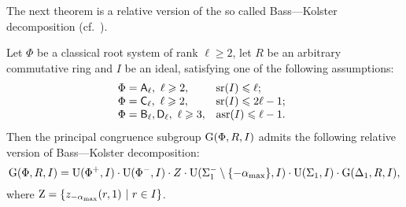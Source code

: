 The next theorem is a relative version of the so called Bass---Kolster decomposition (cf.~\cite[Theorem~2.1]{St78}).
\begin{thm}\label{thm:BassKolster}
Let $\Phi$ be a classical root system of rank $\ell\geqslant2$, let $R$ be an arbitrary commutative ring and $I$ be an ideal, satisfying one of the following assumptions:
\[\begin{array}{l@{\quad}l@{\quad}l@{\quad}c}
\Phi = \rA_\ell,\ \ell\geqslant 2, & \sr(I) \leqslant \ell; \\
\Phi = \rC_\ell,\ \ell\geqslant 2, & \sr(I) \leqslant 2\ell-1; \\
\Phi = \rB_\ell, \rD_\ell,\ \ell\geqslant 3, & \asr(I) \leqslant \ell-1.
\end{array}\]
Then the principal congruence subgroup $\operatorname{G}(\Phi,R,I)$ admits the following relative version of Bass---Kolster decomposition:
\[ \operatorname{G}(\Phi,R,I)=  \operatorname{U}(\Phi^+,I) \cdot \operatorname{U}(\Phi^-,I) \cdot Z \cdot \operatorname{U}(\Sigma_1^-\setminus\{-\alpha_\mathrm{max}\},I) \cdot \operatorname{U}(\Sigma_1,I) \cdot \operatorname{G}(\Delta_1,R,I), \]
where $\Z=\left\{ z_{-\alpha_\mathrm{max}}(r,1)\ \middle|\ r\in I \right\}$.
\end{thm}
